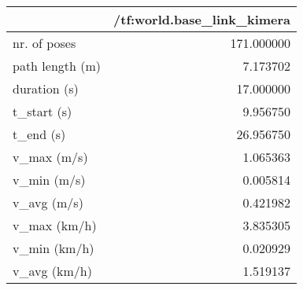 \begin{tabular}{lr}
\toprule
{} &  /tf:world.base\_link\_kimera \\
\midrule
nr. of poses    &                  171.000000 \\
path length (m) &                    7.173702 \\
duration (s)    &                   17.000000 \\
t\_start (s)     &                    9.956750 \\
t\_end (s)       &                   26.956750 \\
v\_max (m/s)     &                    1.065363 \\
v\_min (m/s)     &                    0.005814 \\
v\_avg (m/s)     &                    0.421982 \\
v\_max (km/h)    &                    3.835305 \\
v\_min (km/h)    &                    0.020929 \\
v\_avg (km/h)    &                    1.519137 \\
\bottomrule
\end{tabular}
